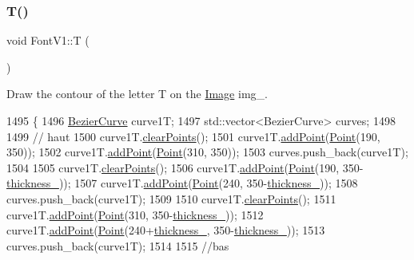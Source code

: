 \subsubsection{\texorpdfstring{T()}{T()}}
{\footnotesize\ttfamily void Font\+V1\+::T (\begin{DoxyParamCaption}{ }\end{DoxyParamCaption})}



Draw the contour of the letter T on the \mbox{\hyperlink{class_image}{Image}} img\+\_\+. 


\begin{DoxyCode}
1495               \{
1496     \mbox{\hyperlink{class_bezier_curve}{BezierCurve}} curve1T;
1497     std::vector<BezierCurve> curves;
1498 
1499     \textcolor{comment}{// haut}
1500     curve1T.\mbox{\hyperlink{class_bezier_curve_a0ba8ce66d5af5971ae6a1b506029728e}{clearPoints}}();
1501     curve1T.\mbox{\hyperlink{class_bezier_curve_a38d16c18b36ae45619b05e26e226cf34}{addPoint}}(\mbox{\hyperlink{class_point}{Point}}(190, 350));
1502     curve1T.\mbox{\hyperlink{class_bezier_curve_a38d16c18b36ae45619b05e26e226cf34}{addPoint}}(\mbox{\hyperlink{class_point}{Point}}(310, 350));
1503     curves.push\_back(curve1T);
1504 
1505     curve1T.\mbox{\hyperlink{class_bezier_curve_a0ba8ce66d5af5971ae6a1b506029728e}{clearPoints}}();
1506     curve1T.\mbox{\hyperlink{class_bezier_curve_a38d16c18b36ae45619b05e26e226cf34}{addPoint}}(\mbox{\hyperlink{class_point}{Point}}(190, 350-\mbox{\hyperlink{class_font_v1_aed8040e76be9a52833627b92f0fb4e5f}{thickness\_}}));
1507     curve1T.\mbox{\hyperlink{class_bezier_curve_a38d16c18b36ae45619b05e26e226cf34}{addPoint}}(\mbox{\hyperlink{class_point}{Point}}(240, 350-\mbox{\hyperlink{class_font_v1_aed8040e76be9a52833627b92f0fb4e5f}{thickness\_}}));
1508     curves.push\_back(curve1T);
1509 
1510     curve1T.\mbox{\hyperlink{class_bezier_curve_a0ba8ce66d5af5971ae6a1b506029728e}{clearPoints}}();
1511     curve1T.\mbox{\hyperlink{class_bezier_curve_a38d16c18b36ae45619b05e26e226cf34}{addPoint}}(\mbox{\hyperlink{class_point}{Point}}(310, 350-\mbox{\hyperlink{class_font_v1_aed8040e76be9a52833627b92f0fb4e5f}{thickness\_}}));
1512     curve1T.\mbox{\hyperlink{class_bezier_curve_a38d16c18b36ae45619b05e26e226cf34}{addPoint}}(\mbox{\hyperlink{class_point}{Point}}(240+\mbox{\hyperlink{class_font_v1_aed8040e76be9a52833627b92f0fb4e5f}{thickness\_}}, 350-\mbox{\hyperlink{class_font_v1_aed8040e76be9a52833627b92f0fb4e5f}{thickness\_}}));
1513     curves.push\_back(curve1T);
1514 
1515     \textcolor{comment}{//bas}

\end{DoxyCode}
